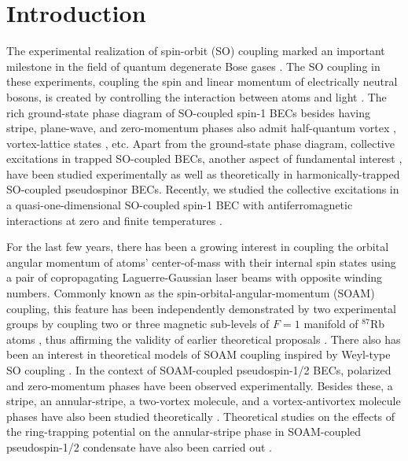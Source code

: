 \documentclass[pra,twocolumn,aps,superscriptaddress,showpacs,longbibliography]{revtex4-1}
\begin{document}
\section{Introduction}
The experimental realization of spin-orbit (SO) coupling marked an important milestone 
in the field of quantum degenerate Bose gases \cite{lin2011spin,campbell2016magnetic,luo2016tunable}.
The SO coupling in these experiments, coupling the spin and linear momentum of electrically neutral bosons, 
is created by controlling the interaction between atoms and light \cite{lin2011spin,campbell2016magnetic,luo2016tunable,goldman2014light}.
The rich ground-state phase diagram of SO-coupled spin-1 BECs besides having stripe, plane-wave, and 
zero-momentum phases \cite{wang2010spin,martone2016tricriticalities} also admit half-quantum vortex \cite{ramachandhran2012half}, 
vortex-lattice states \cite{ruokokoski2012stationary}, etc. Apart from the ground-state phase diagram, 
collective excitations in trapped SO-coupled BECs, another aspect of fundamental interest \cite{pethick_smith_2008,pitaevskii2016bose}, have been
studied experimentally \cite{PhysRevA.90.063624, PhysRevLett.114.105301} as well as theoretically \cite{PhysRevA.95.033616, PhysRevLett.127.115301} 
in harmonically-trapped SO-coupled pseudospinor BECs. Recently, we studied the collective excitations in 
a quasi-one-dimensional SO-coupled spin-1 BEC with antiferromagnetic interactions at zero and finite 
temperatures \cite{PhysRevA.106.013304}. 

For the last few years, there has been a growing interest in coupling the orbital angular momentum of atoms' center-of-mass 
with their internal spin states using a pair of copropagating Laguerre-Gaussian laser beams with opposite winding numbers.
Commonly known as the spin-orbital-angular-momentum (SOAM) coupling, this feature has been independently demonstrated 
by two experimental groups by coupling two \cite{zhang2019ground} or three magnetic sub-levels of $F = 1$ manifold of $^{87}$Rb atoms
\cite{chen2018spin,chen2018rotating}, thus affirming the validity of earlier theoretical proposals \cite{PhysRevA.92.033615,demarco2015angular,sun2015spin,qu2015quantum,chen2016spin,peng2022spin}. 
There also has been an interest in theoretical models of SOAM coupling inspired 
by Weyl-type SO coupling \cite{xu2020phase}.
In the context of SOAM-coupled pseudospin-1/2 BECs, polarized and zero-momentum phases have been observed
experimentally. Besides these, a stripe, an annular-stripe, a two-vortex molecule, and a vortex-antivortex molecule phases have also
been studied theoretically \cite{qu2015quantum,duan2020symmetry,chen2020angular,chiu2020visible}.  
Theoretical studies on the effects of the ring-trapping potential on the annular-stripe phase in SOAM-coupled pseudospin-1/2 condensate 
have also been carried out \cite{sun2015spin,bidasyuk2022fine}. 
  
\end{document}
